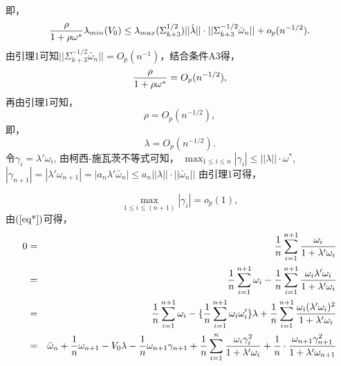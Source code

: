 \documentclass[onecolumn]{ctexart}	%
\begin{document}
即，
 $${\rho\over 1+\rho\omega^*}\lambda_{min} (V_0) \le  \lambda_{max} ( \Sigma_{k+3}^{1/2})||\hat{\lambda}|| \cdot ||\Sigma_{k+3}^{-1/2}\bar{\omega}_n||+o_p(n^{-1/2}).$$
 由引理1可知$||\Sigma_{k+3}^{-1/2}\bar{\omega}_n||=O_p(n^{-1})$，结合条件A3得，
$${\rho\over 1+\rho\omega^*}= O_p(n^{-1/2}),$$
再由引理1可知，
$${\rho}= O_p(n^{-1/2}),$$
即，
\begin{equation}
\lambda= O_p(n^{-1/2}) .\label{lam}
\end{equation}
令$\gamma_i=\lambda'\omega_i$, 由柯西-施瓦茨不等式可知，
$\max_{ 1\leq i\leq n}|  \gamma_i | \le  ||\lambda || \cdot \omega^*  $, \ $|  \gamma_{n+1} | =  |\lambda' \omega_{n+1} |=|a_n \lambda' \bar{\omega}_{n} |\le  a_n||\lambda || \cdot  ||\bar{\omega}_{n}||$
由引理1可得，

\begin{equation}
\max_{ 1\leq i\leq (n+1)} |  \gamma_i |=o_p(1) ,\label{op1}
\end{equation}
由$\rm(\ref{eq*}) $可得，
\begin{eqnarray*}
0 &=&{1 \over n}\sum^{n+1}_{i=1}{\omega_i \over 1+\lambda'\omega_i}\\
&=&{1 \over n}\sum^{n+1}_{i=1}{\omega_i}-{1 \over n}\sum^{n+1}_{i=1}{\omega_i\lambda'\omega_i \over 1+\lambda'\omega_i} \\
&=&{1 \over n}\sum^{n+1}_{i=1}{\omega_i}-\{{1 \over n}\sum^{n+1}_{i=1}\omega_i\omega_i '\}\lambda+{1 \over n}\sum^{n+1}_{i=1}{\omega_i(\lambda'\omega_i)^2 \over 1+\lambda'\omega_i}\\
&=&\bar{\omega}_n+{1 \over n}\omega_{n+1}-V_0\lambda-{1 \over n}\omega_{n+1}\gamma_{n+1}+{1 \over n}\sum^{n}_{i=1}{\omega_i\gamma_i^2 \over 1+\lambda'\omega_i}+{1 \over n} \cdot {\omega_{n+1}\gamma_{n+1}^2 \over 1+\lambda'\omega_{n+1}}
\end{eqnarray*}
\end{document}
